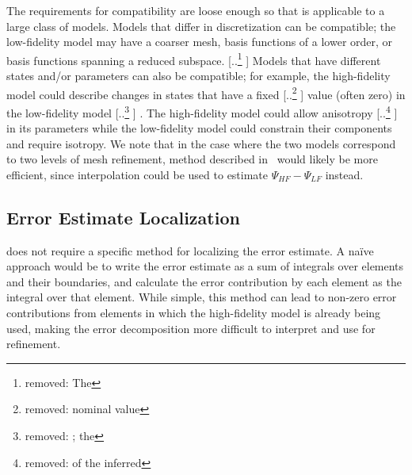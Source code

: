 \documentclass[review,sort&compress]{elsarticle}
\theoremstyle{plain} %
\theoremstyle{definition} %
\providecommand{\DIFaddtex}[1]{{\protect\color{blue} \sf #1}} %
\providecommand{\DIFdeltex}[1]{{\protect\color{red} [..\footnote{removed: #1} ]}} %
\providecommand{\DIFaddbegin}{} %
\providecommand{\DIFaddend}{} %
\providecommand{\DIFdelbegin}{} %
\providecommand{\DIFdelend}{} %
\providecommand{\DIFadd}[1]{\texorpdfstring{\DIFaddtex{#1}}{#1}} %
\providecommand{\DIFdel}[1]{\texorpdfstring{\DIFdeltex{#1}}{}} %
\newcommand{\DIFscaledelfig}{0.5}
\newlength{\DIFdelgraphicswidth} %
\newlength{\DIFdelgraphicsheight} %
\newcommand{\DIFaddincludegraphics}[2][]{{\color{blue}\fbox{\DIFOincludegraphics[#1]{#2}}}} %
\newcommand{\DIFdelincludegraphics}[2][]{%
\sbox{\DIFdelgraphicsbox}{\DIFOincludegraphics[#1]{#2}}%
\settoboxwidth{\DIFdelgraphicswidth}{\DIFdelgraphicsbox} %
\settoboxtotalheight{\DIFdelgraphicsheight}{\DIFdelgraphicsbox} %
\scalebox{\DIFscaledelfig}{%
\parbox[b]{\DIFdelgraphicswidth}{\usebox{\DIFdelgraphicsbox}\\[-\baselineskip] \rule{\DIFdelgraphicswidth}{0em}}\llap{\resizebox{\DIFdelgraphicswidth}{\DIFdelgraphicsheight}{%
\setlength{\unitlength}{\DIFdelgraphicswidth}%
\begin{picture}(1,1)%
\thicklines\linethickness{2pt} %
{\color[rgb]{1,0,0}\put(0,0){\framebox(1,1){}}}%
{\color[rgb]{1,0,0}\put(0,0){\line( 1,1){1}}}%
{\color[rgb]{1,0,0}\put(0,1){\line(1,-1){1}}}%
\end{picture}%
}\hspace*{3pt}}} %
} %
\DeclareRobustCommand{\DIFaddbegin}{\DIFOaddbegin \let\includegraphics\DIFaddincludegraphics} %
\DeclareRobustCommand{\DIFaddend}{\DIFOaddend \let\includegraphics\DIFOincludegraphics} %
\DeclareRobustCommand{\DIFdelbegin}{\DIFOdelbegin \let\includegraphics\DIFdelincludegraphics} %
\DeclareRobustCommand{\DIFdelend}{\DIFOaddend \let\includegraphics\DIFOincludegraphics} %
\begin{document}
\DIFadd{The requirements for compatibility are loose enough so that \Cref{alg:refSeries} is applicable to a large class of models. Models that differ in discretization can be compatible; the }\DIFaddend low-fidelity model may have a coarser mesh, basis functions of a lower order, or basis functions spanning a reduced subspace. \DIFdelbegin \DIFdel{The }\DIFdelend \DIFaddbegin \DIFadd{Models that have different states and/or parameters can also be compatible; for example, the }\DIFaddend high-fidelity model could describe changes in states that have a fixed \DIFdelbegin \DIFdel{nominal value }\DIFdelend \DIFaddbegin \DIFadd{value (often zero) }\DIFaddend in the low-fidelity model\DIFdelbegin \DIFdel{; the }\DIFdelend \DIFaddbegin \DIFadd{. The }\DIFaddend high-fidelity model could allow anisotropy \DIFdelbegin \DIFdel{of the inferred }\DIFdelend \DIFaddbegin \DIFadd{in its }\DIFaddend parameters while the low-fidelity model could constrain their components and require isotropy. We note that in the case where the two models correspond to two levels of mesh refinement, method described in~\cite{BecVex05} would likely be more efficient, since interpolation could be used to estimate $\Psi_{HF}-\Psi_{LF}$ instead.

\subsection{Error Estimate Localization}\label{sec:errLocal}

 does not require a specific method for localizing the error estimate. A na\"{i}ve approach would be to write the error estimate as a sum of integrals over elements and their boundaries, and calculate the error contribution by each element as the integral over that element. While simple, this method can lead to non-zero error contributions from elements in which the high-fidelity model is already being used, making the error decomposition more difficult to interpret and use for refinement.
\end{document}
